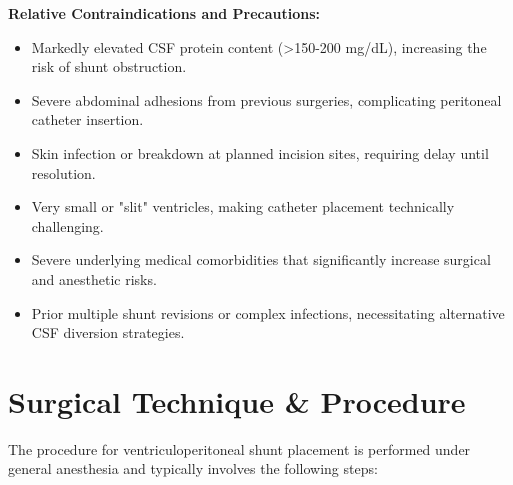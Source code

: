 \textbf{Relative Contraindications and Precautions:}

\begin{itemize}
  \item Markedly elevated CSF protein content (>150-200 mg/dL), increasing the risk of shunt obstruction.
  \item Severe abdominal adhesions from previous surgeries, complicating peritoneal catheter insertion.
  \item Skin infection or breakdown at planned incision sites, requiring delay until resolution.
  \item Very small or "slit" ventricles, making catheter placement technically challenging.
  \item Severe underlying medical comorbidities that significantly increase surgical and anesthetic risks.
  \item Prior multiple shunt revisions or complex infections, necessitating alternative CSF diversion strategies.
\end{itemize}

\section*{Surgical Technique \& Procedure}
The procedure for ventriculoperitoneal shunt placement is performed under general anesthesia and typically involves the following steps:


